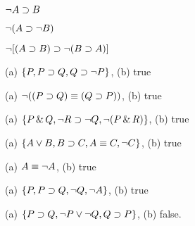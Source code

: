 \begin{earg}
\item %
$\neg A \supset B$
\item %
$\neg(A \supset \neg B)$
\item %
$\neg [(A\supset B) \supset \neg(B\supset A)]$
\end{earg}



\begin{earg}
\item (a) $\{P, P \supset Q, Q \supset \neg P\}$, (b) true
\item (a) $\neg((P \supset Q) \equiv (Q \supset P))$, (b) true
\item (a) $\{P \,\&\, Q, \neg R \supset \neg Q, \neg (P \,\&\, R)\}$, (b) true
\item (a) $\{A \vee B, B \supset C, A \equiv C, \neg C\}$, (b) true
\item (a) $A \equiv \neg A$, (b) true
\item (a) $\{P, P \supset Q, \neg Q, \neg A\}$, (b) true
\item (a) $\{P \supset Q, \neg P \vee \neg Q, Q \supset P\}$, (b) false.
\end{earg}



